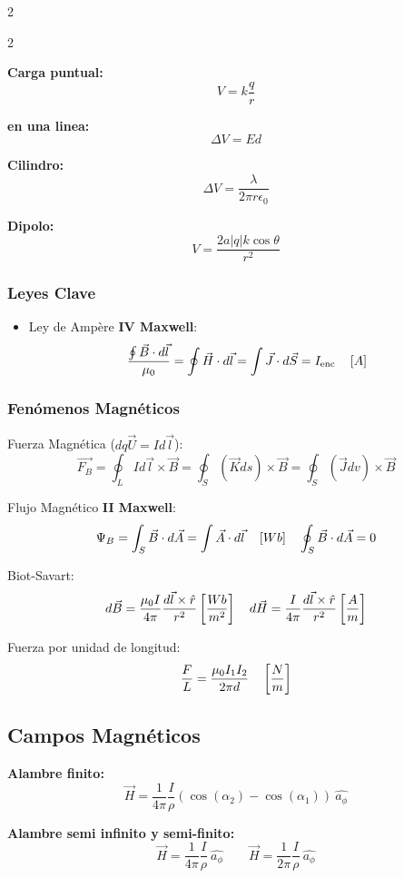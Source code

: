 \documentclass{article}
\begin{document}
\begin{multicols}{2}
\begin{multicols}{2}
  \begin{itemform}
    \item \textbf{Carga puntual:}
    $$V=k\dfrac{q}{r}$$
    \item \textbf{en una linea:}
    $$\Delta V = Ed$$
    \item \textbf{Cilindro:}
    $$\Delta V= \dfrac{\lambda}{2 \pi r \epsilon_0}$$
    \item \textbf{Dipolo:}
    $$V=\dfrac{2a|q|k \cos \theta}{r^2}$$
  \end{itemform}
  \end{multicols}

\columnbreak

  \subsubsection*{Leyes Clave}
  \begin{itemize}[leftmargin=*]
    \item Ley de Ampère \textbf{IV Maxwell}:
    $$\dfrac{\oint \vec{B}\cdot d\vec{l}}{\mu_0} = \oint \vec{H}\cdot d\vec{l} = \int \vec{J} \cdot d\vec{S} =  I_{\text{enc}} \quad \left[A \right]$$
  \end{itemize}

  \subsubsection*{Fenómenos Magnéticos}
  \begin{itemform}
    \item Fuerza Magnética ($dq\vec{U}=Id\vec{l}$):
    $$\vec{F_B}= \oint_{L} Id\vec{l}\times\vec{B}=\oint_{S} (\vec{K}ds)\times\vec{B}=\oint_{S} (\vec{J}dv)\times\vec{B}$$
    \item Flujo Magnético \textbf{II Maxwell}:
    $$\Psi_B = \int_S \vec{B}\cdot d\vec{A}=\int \vec{A} \cdot d\vec{l}  \quad \left[Wb \right] \quad \oint_S \vec{B}\cdot d\vec{A}=0$$
    \item Biot-Savart:
    $$d\vec{B}=\dfrac{\mu_0I}{4\pi}\dfrac{d\vec{l}\times\hat{r}}{r^2} \left[\dfrac{Wb}{m^2} \right]\quad d\vec{H}=\dfrac{I}{4\pi}\dfrac{d\vec{l}\times\hat{r}}{r^2} \left[\dfrac{A}{m} \right]$$
    \item Fuerza por unidad de longitud:
    $$\frac{F}{L} = \frac{\mu_0 I_1I_2}{2\pi d} \quad \left[\dfrac{N}{m} \right]$$
  \end{itemform}

  \subsection*{Campos Magnéticos}
  \begin{itemform}
    \item \textbf{Alambre finito:}
    $$\vec{H}=\dfrac{1}{4 \pi} \dfrac{I}{\rho} (\cos(\alpha_2)-\cos(\alpha_1)) \ \hat{a_\phi}$$
    \item \textbf{Alambre semi infinito y semi-finito:}
    $$\vec{H}=\dfrac{1}{4 \pi} \dfrac{I}{\rho}  \ \hat{a_\phi} \qquad \vec{H}=\dfrac{1}{2 \pi} \dfrac{I}{\rho}  \ \hat{a_\phi}$$

  \end{itemform}
\end{multicols}
\end{document}
